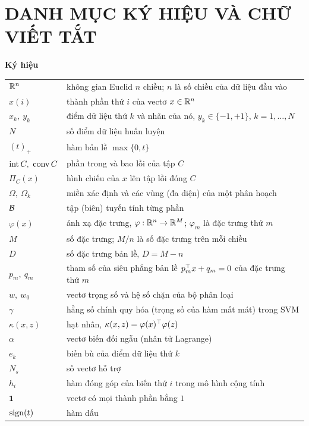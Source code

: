 \chapter*{DANH MỤC KÝ HIỆU VÀ CHỮ VIẾT TẮT}

\begingroup
\renewcommand{\arraystretch}{1.02}
\noindent\textbf{Ký hiệu}

\smallskip
\noindent\begin{tabularx}{\linewidth}{@{}p{3.1cm}X@{}}
$\mathbb{R}^n$ & không gian Euclid $n$ chiều; $n$ là số chiều của dữ liệu đầu vào\\
$x(i)$ & thành phần thứ $i$ của vectơ $x\in\mathbb{R}^n$\\
$x_k,\ y_k$ & điểm dữ liệu thứ $k$ và nhãn của nó, $y_k\in\{-1,+1\}$, $k=1,\dots,N$\\
$N$ & số điểm dữ liệu huấn luyện\\
$(t)_+$ & hàm bản lề $\max\{0,t\}$\\
$\operatorname{int} C,\ \operatorname{conv} C$ & phần trong và bao lồi của tập $C$\\
$\Pi_C(x)$ & hình chiếu của $x$ lên tập lồi đóng $C$\\
$\Omega,\ \Omega_k$ & miền xác định và các vùng (đa diện) của một phân hoạch\\
$\mathcal{B}$ & tập (biên) tuyến tính từng phần\\
$\varphi(x)$ & ánh xạ đặc trưng, $\varphi:\mathbb{R}^n\to\mathbb{R}^M$; $\varphi_m$ là đặc trưng thứ $m$\\
$M$ & số đặc trưng; $M/n$ là số đặc trưng trên mỗi chiều\\
$D$ & số đặc trưng bản lề, $D=M-n$\\
$p_m,\ q_m$ & tham số của siêu phẳng bản lề $p_m^\top x+q_m=0$ của đặc trưng thứ $m$\\
$w,\ w_0$ & vectơ trọng số và hệ số chặn của bộ phân loại\\
$\gamma$ & hằng số chính quy hóa (trọng số của hàm mất mát) trong SVM\\
$\kappa(x,z)$ & hạt nhân, $\kappa(x,z)=\varphi(x)^\top\varphi(z)$\\
$\alpha$ & vectơ biến đối ngẫu (nhân tử Lagrange)\\
$e_k$ & biến bù của điểm dữ liệu thứ $k$\\
$N_s$ & số vectơ hỗ trợ\\
$h_i$ & hàm đóng góp của biến thứ $i$ trong mô hình cộng tính\\
$\mathbf 1$ & vectơ có mọi thành phần bằng $1$\\
$\operatorname{sign}(t)$ & hàm dấu\\
\end{tabularx}

